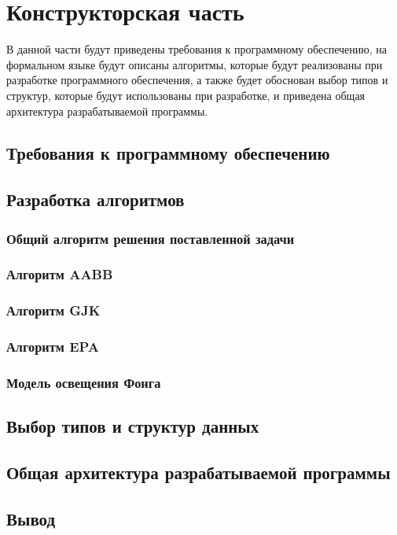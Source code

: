 \section{Конструкторская часть}


В данной части будут приведены требования к программному обеспечению, на формальном языке будут описаны алгоритмы, которые будут реализованы при разработке программного обеспечения, а также будет обоснован выбор типов и структур, которые будут использованы при разработке, и приведена общая архитектура разрабатываемой программы.

\subsection{Требования к программному обеспечению}


\subsection{Разработка алгоритмов}

\subsubsection{Общий алгоритм решения поставленной задачи}


\subsubsection{Алгоритм AABB}

\subsubsection{Алгоритм GJK}

\subsubsection{Алгоритм EPA}

\subsubsection{Модель освещения Фонга}

\subsection{Выбор типов и структур данных}

\subsection{Общая архитектура разрабатываемой программы}


\subsection*{Вывод}

